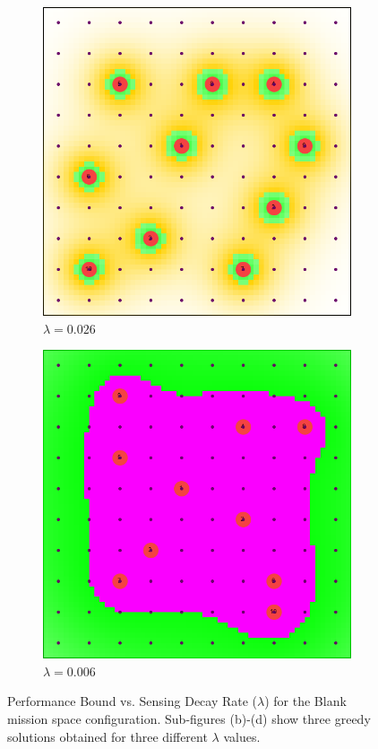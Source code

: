 \documentclass[conference]{IEEEtran}
\begin{document}
\begin{figure}[!h]
\begin{subfigure}[t]{0.105\textwidth}
        \includegraphics[width=\textwidth]{Figures/Blank2_2.png}
        \caption{$\lambda=0.026$}
    \end{subfigure}\hspace{3mm}
    \begin{subfigure}[t]{0.105\textwidth}
        \centering
        \includegraphics[width=\textwidth]{Figures/Blank2_3.png}
        \caption{$\lambda=0.006$}
    \end{subfigure}
    \caption{Performance Bound vs. Sensing Decay Rate ($\lambda$) for the Blank mission space configuration. Sub-figures (b)-(d) show three greedy solutions obtained for three different $\lambda$ values.}
    \label{Fig:BlankConfigBetaVsDecay}
\end{figure}
\end{document}
